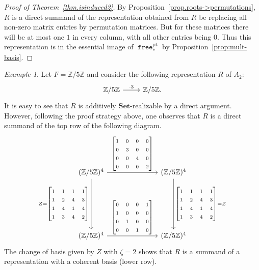 \documentclass[a4paper]{amsart}
\theoremstyle{plain}
\theoremstyle{definition}
\theoremstyle{remark}
\newtheorem{example}[theorem]{Example}
\newcommand{\funct}[1]{\operatorname{\mathtt{#1}}}
\newcommand{\Set}{\mathbf{Set}}
\newcommand{\Z}{\mathbb{Z}}
\begin{document}
\begin{proof}[Proof of Theorem~\ref{thm.isinduced2}]
By Proposition~\ref{prop.roots->permutations}, \( R \) is a direct summand of the representation obtained from \( R \) be replacing all non-zero matrix entries by permutation matrices. But for these matrices there will be at most one \( 1 \) in every column, with all other entries being \( 0 \). Thus this representation is in the essential image of \( \funct{free}^\mathrm{pt}_* \) by Proposition~\ref{prop:mult-basis}.
\end{proof}
\begin{example}
Let $F=\Z/5\Z$ and consider the following representation $R$ of $A_2$:
\[
\begin{tikzcd}
\Z/5\Z\ar[r,"\cdot 3"] & \Z/5\Z.
\end{tikzcd}
\]
It is easy to see that $R$ is additively $\Set$-realizable by a direct argument. However, following the proof strategy above, one observes that $R$ is a direct summand of the top row of the following diagram.
\[
\begin{tikzcd}[sep=25mm, ampersand replacement=\&]
(\Z/5\Z)^4\ar{d}[swap]{Z = \begin{bmatrix} 1 & 1 & 1 & 1 \\ 1 & 2 & 4 & 3 \\ 1 & 4 & 1 & 4 \\ 1 & 3 & 4 & 2
\end{bmatrix}} \ar{r}{\begin{bmatrix} 1 & 0 & 0 &0 \\ 0 & 3 & 0 & 0 \\ 0 & 0 & 4 & 0 \\ 0 & 0 & 0 & 2 \end{bmatrix}} \& (\Z/5\Z)^4 \ar{d}{\begin{bmatrix} 1 & 1 & 1 & 1 \\ 1 & 2 & 4 & 3 \\ 1 & 4 & 1 & 4 \\ 1 & 3 & 4 & 2
\end{bmatrix} =Z} \\
(\Z/5\Z)^4\ar{r}{\begin{bmatrix} 0 & 0 & 0 & 1 \\ 1 & 0 & 0 & 0 \\ 0 & 1 & 0 & 0 \\ 0 & 0 & 1 & 0 \end{bmatrix}} \& (\Z/5\Z)^4
\end{tikzcd}
\]
The change of basis given by $Z$ with $\zeta=2$ shows that $R$ is a summand of a representation with a coherent basis (lower row). 
\end{example}
\end{document}
